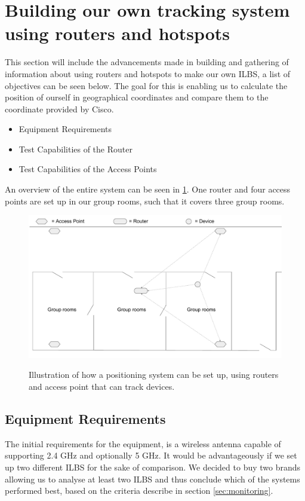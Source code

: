 \section{Building our own tracking system using routers and hotspots}
This section will include the advancements made in building and gathering of information about using routers and hotspots to make our own ILBS, a list of objectives can be seen below. The goal for this is enabling us to calculate the position of ourself in geographical coordinates and compare them to the coordinate provided by Cisco.

\begin{itemize}
	\item Equipment Requirements
	\item Test Capabilities of the Router 
	\item Test Capabilities of the Access Points
\end{itemize}

An overview of the entire system can be seen in \cref{fig:OwnSetup}. One router and four access points are set up in our group rooms, such that it covers three group rooms.
\begin{figure}[H]
	\centering
	\includegraphics[scale=0.5]{graphics/Router-AccessPoint_Setup.pdf}
	\label{fig:OwnSetup}
	\caption{Illustration of how a positioning system can be set up, using routers and access point that can track devices.}
\end{figure}

\subsection*{Equipment Requirements}
The initial requirements for the equipment, is a wireless antenna capable of supporting 2.4 GHz and optionally 5 GHz. It would be advantageously if we set up two different ILBS for the sake of comparison. We decided to buy two brands allowing us to analyse at least two ILBS and thus conclude which of the systems performed best, based on the criteria describe in section \ref{sec:monitoring}.

